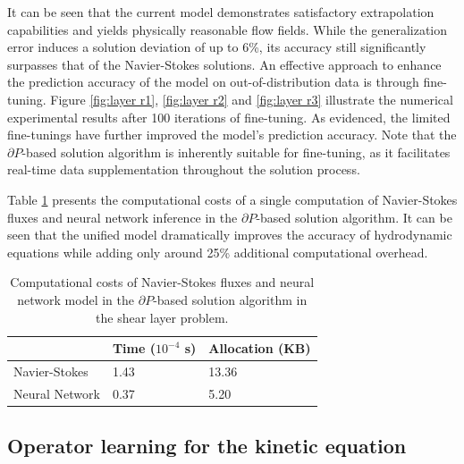 \documentclass[preprint,3p,12pt,sort&compress]{elsarticle}
\begin{document}
It can be seen that the current model demonstrates satisfactory extrapolation capabilities and yields physically reasonable flow fields.
While the generalization error induces a solution deviation of up to 6\%, its accuracy still significantly surpasses that of the Navier-Stokes solutions.
An effective approach to enhance the prediction accuracy of the model on out-of-distribution data is through fine-tuning.
Figure \ref{fig:layer r1}, \ref{fig:layer r2} and \ref{fig:layer r3} illustrate the numerical experimental results after 100 iterations of fine-tuning.
As evidenced, the limited fine-tunings have further improved the model's prediction accuracy.
Note that the $\partial P$-based solution algorithm is inherently suitable for fine-tuning, as it facilitates real-time data supplementation throughout the solution process.

Table \ref{tab:layer cost} presents the computational costs of a single computation of Navier-Stokes fluxes and neural network inference in the $\partial P$-based solution algorithm.
It can be seen that the unified model dramatically improves the accuracy of hydrodynamic equations while adding only around 25\% additional computational overhead.

\begin{table}[h]
    \centering
    \caption{Computational costs of Navier-Stokes fluxes and neural network model in the $\partial P$-based solution algorithm in the shear layer problem.}
    \begin{tabular}{lll}
        \toprule
        & Time ($10^{-4}$ s) & Allocation (KB) \\
        \midrule
        Navier-Stokes & 1.43 & 13.36 \\
        Neural Network & 0.37 & 5.20 \\
        \bottomrule
    \end{tabular}
    \label{tab:layer cost}
\end{table}

\subsection{Operator learning for the kinetic equation}
\end{document}
